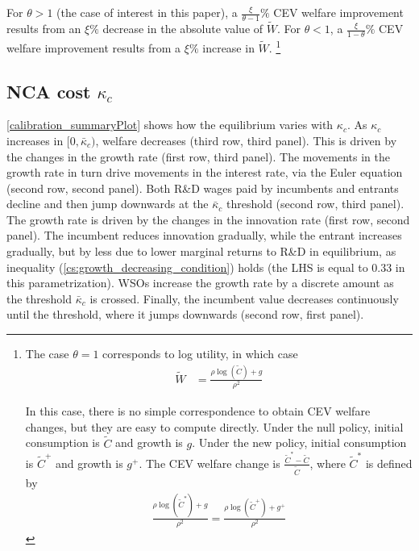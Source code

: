 \documentclass[11pt,english]{article}
\begin{document}
For $\theta > 1$ (the case of interest in this paper), a $\frac{\xi}{\theta-1}\%$ CEV welfare improvement results from an $\xi\%$ decrease in the absolute value of $\tilde{W}$. For $\theta < 1$, a $\frac{\xi}{1-\theta}\%$ CEV welfare improvement results from a $\xi\%$ increase in $\tilde{W}$. \footnote{The case $\theta = 1$ corresponds to log utility, in which case
	\begin{align}
	\tilde{W} &= \frac{\rho \log(\tilde{C}) + g}{\rho^2} \label{eq:agg_welfare_log}
	\end{align}
	
	In this case, there is no simple correspondence to obtain CEV welfare changes, but they are easy to compute directly. Under the null policy, initial consumption is $\tilde{C}$ and growth is $g$. Under the new policy, initial consumption is $\tilde{C}^+$ and growth is $g^+$. The CEV welfare change is $\frac{\tilde{C}^* - \tilde{C}}{\tilde{C}}$, where $\tilde{C}^*$ is defined by 
	\begin{align}
	\frac{\rho\log(\tilde{C}^*) + g}{\rho^2} = \frac{\rho \log(\tilde{C}^+) + g^+}{\rho^2} \label{eq:agg_welfare_log_CEV}
	\end{align}}

\subsection{NCA cost $\kappa_c$}

\autoref{calibration_summaryPlot} shows how the equilibrium varies with $\kappa_c$. As $\kappa_c$ increases in $[0,\bar{\kappa}_c)$, welfare decreases (third row, third panel). This is driven by the changes in the growth rate (first row, third panel). The movements in the growth rate in turn drive movements in the interest rate, via the Euler equation (second row, second panel). Both R\&D wages paid by incumbents and entrants decline and then jump downwards at the $\bar{\kappa}_c$ threshold (second row, third panel). The growth rate is driven by the changes in the innovation rate (first row, second panel). The incumbent reduces innovation gradually, while the entrant increases gradually, but by less due to lower marginal returns to R\&D in equilibrium, as inequality (\ref{cs:growth_decreasing_condition}) holds (the LHS is equal to 0.33 in this parametrization). WSOs increase the growth rate by a discrete amount as the threshold $\bar{\kappa}_c$ is crossed. Finally, the incumbent value decreases continuously until the threshold, where it jumps downwards (second row, first panel). 
\end{document}
